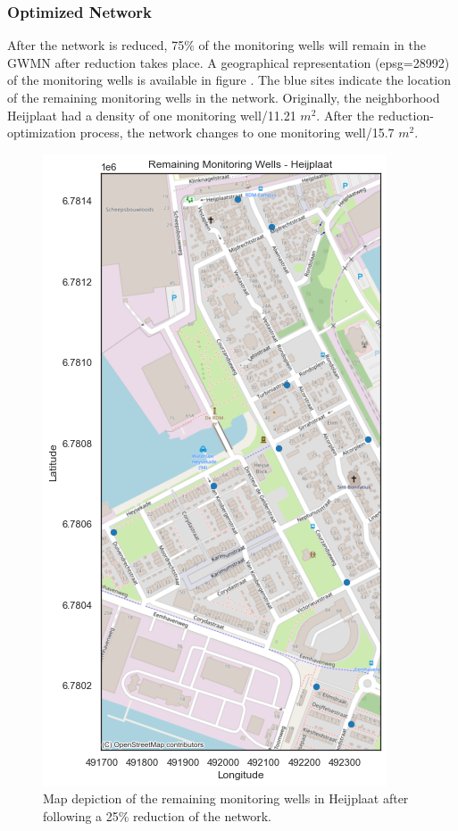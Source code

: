 \subsubsection{Optimized Network}
After the network is reduced, 75\% of the monitoring wells will remain in the GWMN after reduction takes place. A geographical representation (epsg=28992) of the monitoring wells is available in figure . The blue sites indicate the location of the remaining monitoring wells in the network. Originally, the neighborhood Heijplaat had a density of one monitoring well/11.21 $m^2$. After the reduction-optimization process, the network changes to one monitoring well/15.7 $m^2$.


\begin{figure}[htbp]
    \centering
    \includegraphics[width=0.60\linewidth]{frontmatter/Heijplaat-fig/After.png}
    \caption{Map depiction of the remaining monitoring wells in Heijplaat after following a 25\% reduction of the network.}
    \label{afterheij}
\end{figure}



